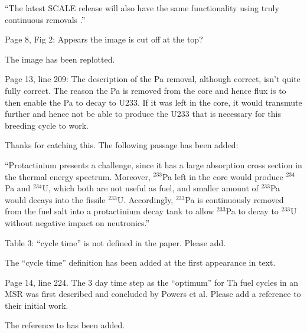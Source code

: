 \documentclass[answers,11pt]{exam}
\begin{document}
\begin{questions}
\begin{solution}
		        ``The latest SCALE release will also have the same functionality using 
        		truly continuous removals \cite{betzler_implementation_2017}.''
        \end{solution}

        \question  Page 8, Fig 2: Appears the image is cut off at the top?
        \begin{solution}
        The image has been replotted.
        \end{solution}

        \question  Page 13, line 209: The description of the Pa removal, 
        although correct, isn't quite fully correct. The reason the Pa is 
        removed from the core and hence flux is to then enable the Pa to decay 
        to U233. If it was left in the core, it would transmute further and 
        hence not be able to produce the U233 that is necessary for this 
        breeding cycle to work.
        \begin{solution}
        		Thanks for catching this. The following passage has been added:
        
		        ``Protactinium presents a challenge, since it has a large absorption cross 
				section in the thermal energy spectrum. Moreover, $^{233}$Pa left in the core
				 would produce $^{234}$Pa and $^{234}$U, which both are not useful as fuel, 
				and smaller amount of $^{233}$Pa would decays into the fissile $^{233}$U.
				Accordingly, $^{233}$Pa is continuously 
				removed from the fuel salt into a protactinium decay tank to allow $^{233}$Pa 
				to decay to $^{233}$U without negative impact 
                                on neutronics.''
        \end{solution}

        \question  Table 3: ``cycle time'' is not defined in the paper. Please 
        add.
        \begin{solution}
                        The ``cycle time'' definition has been added at the first 
                        appearance in text. 
        \end{solution}

        \question  Page 14, line 224. The 3 day time step as the ``optimum'' for 
        Th fuel cycles in an MSR was first described and concluded by Powers et 
        al. Please add a reference to their initial work.
        \begin{solution}
        		The reference to \cite{powers_new_2013} has been added.
        \end{solution}


\end{questions}
\end{document}
